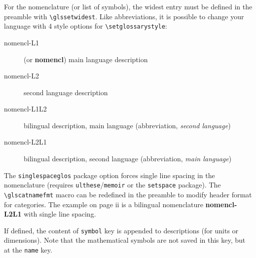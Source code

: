 \documentclass[projet,nohyperref,article,english,french]{ulthese}
\begin{document}
For the nomenclature (or list of symbols), the widest entry must be defined in the preamble with \texttt{\textbackslash glssetwidest}. Like abbreviations, it is possible to change your language with 4 style options for \texttt{\textbackslash setglossarystyle}:
\begin{description}
	\item[nomencl-L1] (or \textbf{nomencl}) main language description
	\item[nomencl-L2] second language description
	\item[nomencl-L1L2] bilingual description, main language (abbreviation, \textit{second language})
	\item[nomencl-L2L1] bilingual description, second language (abbreviation, \textit{main language})
\end{description}
The \texttt{singlespaceglos} package option forces single line spacing in the nomenclature (requires \texttt{ulthese}/\texttt{memoir} or the \texttt{setspace} package). The \texttt{\textbackslash glscatnamefmt} macro can be redefined in the preamble to modify header format for categories. The example on page ii is a bilingual nomenclature \textbf{nomencl-L2L1} with single line spacing.

If defined, the content of \texttt{symbol} key is appended to descriptions (for units or dimensions). Note that the mathematical symbols are not saved in this key, but at the \texttt{name} key.
\end{document}
